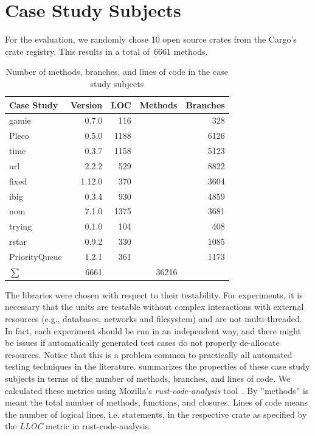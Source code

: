 \documentclass[paper=a4,%
  twoside,%
  BCOR4mm,%
  abstract=true,%
  toc=bibliography,%
  chapterprefix=true,%
  toc=bibliographynumbered,%
  open=right,%
  english,%
  pagesize=pdftex]{scrreprt}
\newcommand{\benchnum}{10\xspace}
\newcommand{\loc}{36216\xspace}
\newcommand{\methodsnum}{6661\xspace}
\begin{document}
\section{Case Study Subjects}
\label{sec:case-study-subjects}
For the evaluation, we randomly chose \benchnum open source crates from the Cargo's crate registry. This results in a total of~\methodsnum methods.

\begin{table}[]
\begin{tabular*}{\textwidth}{l @{\extracolsep{\fill}} rrrr}
\hline
\textbf{Case Study} & \textbf{Version} & \textbf{LOC} & \textbf{Methods} & \textbf{Branches} \\
\hline
gamie & 0.7.0 & 116 &  & 328 \\
Pleco & 0.5.0 & 1188 &  & 6126 \\
time & 0.3.7 & 1158 &  & 5123 \\
url & 2.2.2 & 529 &  & 8822 \\
fixed & 1.12.0 & 370 &  & 3604 \\
ibig & 0.3.4 & 930 &  & 4859 \\
nom & 7.1.0 & 1375 &  & 3681 \\
trying & 0.1.0 & 104 &  & 408 \\
rstar & 0.9.2 & 330 &  & 1085 \\
PriorityQueue & 1.2.1 & 361 &  & 1173 \\
\hline
$\sum$ & \methodsnum & & \loc \\
\hline
\end{tabular*}
\caption{\label{tab:properties-of-case-study-subjects}Number of methods, branches, and lines of code in the case study subjects}
\end{table}
The libraries were chosen with respect to their testability. For experiments, it is necessary that the units are testable without complex interactions with external resources (e.g., databases, networks and filesystem) and are not multi-threaded. In fact, each experiment should be run in an independent way, and there might be issues if automatically generated test cases do not properly de-allocate resources. Notice that this is a problem common to practically all automated testing techniques in the literature.  summarizes the properties of these case study subjects in terms of the number of methods, branches, and lines of code. We calculated these metrics using Mozilla's \emph{rust-code-analysis} tool~\cite{Ardito2020}. By ''methods'' is meant the total number of methods, functions, and closures. Lines of code means the number of logical lines, i.e. statements, in the respective crate as specified by the \emph{LLOC} metric in rust-code-analysis.
\end{document}
